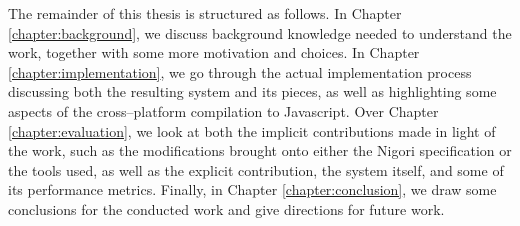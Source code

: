 The remainder of this thesis is structured as follows.
In Chapter \ref{chapter:background}, we discuss background knowledge needed to understand the work, together with some more motivation and choices.
In Chapter \ref{chapter:implementation}, we go through the actual implementation process discussing both the resulting system and its pieces, as well as highlighting some aspects of the cross--platform compilation to Javascript.
Over Chapter \ref{chapter:evaluation}, we look at both the implicit contributions made in light of the work, such as the modifications brought onto either the Nigori specification or the tools used, as well as the explicit contribution, the system itself, and some of its performance metrics.
Finally, in Chapter \ref{chapter:conclusion}, we draw some conclusions for the conducted work and give directions for future work.
